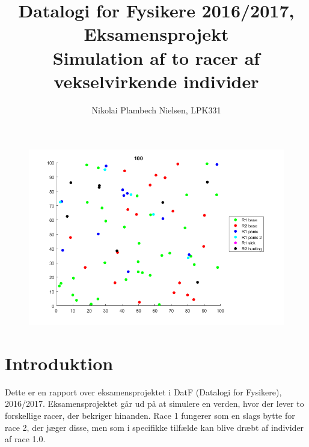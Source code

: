 \documentclass[a4paper,10pt]{article} 	%
\title{%
	Datalogi for Fysikere 2016/2017, Eksamensprojekt\\
	\large Simulation af to racer af vekselvirkende individer}
\author{Nikolai Plambech Nielsen, LPK331}
\numberwithin{equation}{section}
\begin{document}
	
	\clearpage\maketitle
	\thispagestyle{empty}
	\vspace{2cm}
	\begin{figure}[H]
		\centering
		\includegraphics[width=\textwidth]{img/front.png}
	\end{figure}
	\newpage
	\setcounter{page}{1}
	
	\section{Introduktion}
	Dette er en rapport over eksamensprojektet i DatF (Datalogi for Fysikere), 2016/2017. Eksamensprojektet går ud på at simulere en verden, hvor der lever to forskellige racer, der bekriger hinanden. Race 1 fungerer som en slags bytte for race 2, der jæger disse, men som i specifikke tilfælde kan blive dræbt af individer af race 1.0.
	
\end{document}
